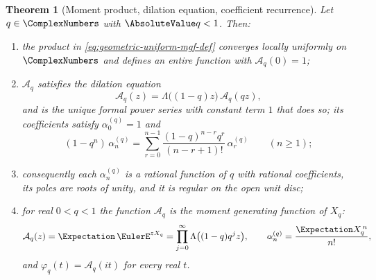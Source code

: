 \documentclass[11pt,a4paper,oneside,openany]{book}
\newtheorem{theorem}{Theorem}[chapter]
\theoremstyle{definition}
\theoremstyle{remark}
\begin{document}
\begin{theorem}[Moment product, dilation equation, coefficient recurrence]
\label{thm:geometric-uniform-mgf}
Let $q\in\ComplexNumbers$ with $\AbsoluteValue q<1$.  Then:
\begin{enumerate}
\item the product in \eqref{eq:geometric-uniform-mgf-def} converges locally uniformly on $\ComplexNumbers$
and defines an entire function with $\mathcal A_q(0)=1$;
\item $\mathcal A_q$ satisfies the dilation equation
\begin{equation}\label{eq:mgf-refinement}
 \mathcal A_q(z)=\Lambda\bigl((1-q)z\bigr)\,\mathcal A_q(qz),
\end{equation}
and is the unique formal power series with constant term $1$ that does so; its coefficients
satisfy $\alpha^{(q)}_0=1$ and
\begin{equation}\label{eq:q-moment-recurrence}
 (1-q^n)\,\alpha^{(q)}_n
 =\sum_{r=0}^{n-1}\frac{(1-q)^{n-r}q^r}{(n-r+1)!}\,\alpha^{(q)}_r
 \qquad(n\ge1);
\end{equation}
\item consequently each $\alpha^{(q)}_n$ is a rational function of $q$ with rational
coefficients, its poles are roots of unity, and it is regular on the open unit disc;
\item for real $0<q<1$ the function $\mathcal A_q$ is the moment generating function of
$X_q$:
\begin{equation}\label{eq:mgf-product}
 \mathcal A_q(z)=\Expectation\,\EulerE^{zX_q}
 =\prod_{j=0}^{\infty}\Lambda\bigl((1-q)q^jz\bigr),
 \qquad
 \alpha^{(q)}_n=\frac{\Expectation X_q^{\,n}}{n!},
\end{equation}
and $\varphi_q(t)=\mathcal A_q(it)$ for every real $t$.
\end{enumerate}
\end{theorem}
\end{document}
